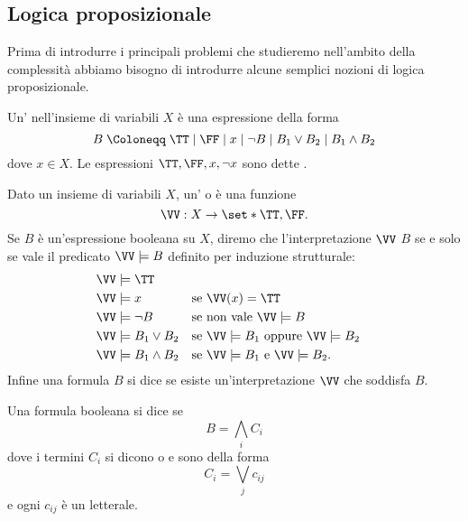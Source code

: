 \subsection{Logica proposizionale}

Prima di introdurre i principali problemi che studieremo nell'ambito della
complessità abbiamo bisogno di introdurre alcune semplici nozioni di logica
proposizionale.

\begin{definition}
   Un' nell'insieme di
  variabili $X$ è una espressione della forma \[
      B \;\Coloneqq\;  
        \TT \mid \FF \mid x \mid \neg B \mid
        B_1 \lor B_2 \mid B_1 \land B_2
  \] dove $x \in X$. Le espressioni $\TT, \FF, x, \neg x$ sono dette 
  .
\end{definition}

\begin{definition}
  Dato un insieme di variabili $X$, un' o
   è una funzione \[
      \VV : X \to \set*{\TT, \FF}.
  \] Se $B$ è un'espressione booleana su $X$, diremo che l'interpretazione
  $\VV$  $B$ se e solo se vale il predicato $\VV \models B$
  definito per induzione strutturale: \begin{align*}
    &\VV \models \TT\\
    &\VV \models x              &&\text{se } \VV(x) = \TT\\
    &\VV \models \neg B         &&\text{se non vale } \VV \models B\\
    &\VV \models B_1 \lor B_2 
        &&\text{se } \VV \models B_1 \text{ oppure } \VV \models B_2\\
    &\VV \models B_1 \land B_2 
        &&\text{se } \VV \models B_1 \text{ e } \VV \models B_2.
  \end{align*}  Infine una formula $B$ si dice 
  se esiste un'interpretazione $\VV$ che soddisfa $B$.  
\end{definition}

\begin{definition}
  Una formula booleana si dice  se \[
      B = \bigwedge_i C_i
  \] dove i termini $C_i$ si dicono  o 
  e sono della forma \[
      C_i = \bigvee_j c_{ij}
  \] e ogni $c_{ij}$ è un letterale.
\end{definition}

